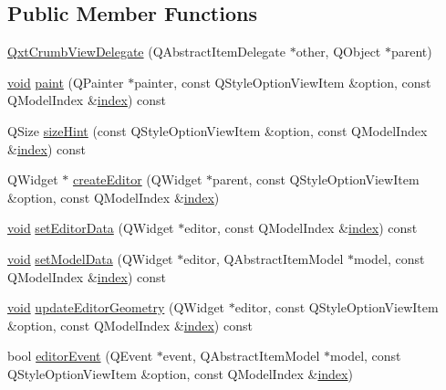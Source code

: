 \subsection*{Public Member Functions}
\begin{DoxyCompactItemize}
\item 
\hyperlink{class_qxt_crumb_view_delegate_ae9c2b83993bc41ea3527bfc10a24a4d6}{Qxt\-Crumb\-View\-Delegate} (Q\-Abstract\-Item\-Delegate $\ast$other, Q\-Object $\ast$parent)
\item 
\hyperlink{group___u_a_v_objects_plugin_ga444cf2ff3f0ecbe028adce838d373f5c}{void} \hyperlink{class_qxt_crumb_view_delegate_a82c74a11eef1a5a22da5bfe0237ffc08}{paint} (Q\-Painter $\ast$painter, const Q\-Style\-Option\-View\-Item \&option, const Q\-Model\-Index \&\hyperlink{glext_8h_ab47dd9958bcadea08866b42bf358e95e}{index}) const 
\item 
Q\-Size \hyperlink{class_qxt_crumb_view_delegate_a0dd337b5990640299b87a9cbba56016c}{size\-Hint} (const Q\-Style\-Option\-View\-Item \&option, const Q\-Model\-Index \&\hyperlink{glext_8h_ab47dd9958bcadea08866b42bf358e95e}{index}) const 
\item 
Q\-Widget $\ast$ \hyperlink{class_qxt_crumb_view_delegate_a87b1dc37aa876eaed3b289a5ee065052}{create\-Editor} (Q\-Widget $\ast$parent, const Q\-Style\-Option\-View\-Item \&option, const Q\-Model\-Index \&\hyperlink{glext_8h_ab47dd9958bcadea08866b42bf358e95e}{index})
\item 
\hyperlink{group___u_a_v_objects_plugin_ga444cf2ff3f0ecbe028adce838d373f5c}{void} \hyperlink{class_qxt_crumb_view_delegate_a2908e932cade12d60307efe8bef55402}{set\-Editor\-Data} (Q\-Widget $\ast$editor, const Q\-Model\-Index \&\hyperlink{glext_8h_ab47dd9958bcadea08866b42bf358e95e}{index}) const 
\item 
\hyperlink{group___u_a_v_objects_plugin_ga444cf2ff3f0ecbe028adce838d373f5c}{void} \hyperlink{class_qxt_crumb_view_delegate_ab4b4d929bc6add0ad936d179ffda930d}{set\-Model\-Data} (Q\-Widget $\ast$editor, Q\-Abstract\-Item\-Model $\ast$model, const Q\-Model\-Index \&\hyperlink{glext_8h_ab47dd9958bcadea08866b42bf358e95e}{index}) const 
\item 
\hyperlink{group___u_a_v_objects_plugin_ga444cf2ff3f0ecbe028adce838d373f5c}{void} \hyperlink{class_qxt_crumb_view_delegate_a2078285feff0102cf16dd2a6370ea1be}{update\-Editor\-Geometry} (Q\-Widget $\ast$editor, const Q\-Style\-Option\-View\-Item \&option, const Q\-Model\-Index \&\hyperlink{glext_8h_ab47dd9958bcadea08866b42bf358e95e}{index}) const 
\item 
bool \hyperlink{class_qxt_crumb_view_delegate_af820fb2b803887674250da0cad524d08}{editor\-Event} (Q\-Event $\ast$event, Q\-Abstract\-Item\-Model $\ast$model, const Q\-Style\-Option\-View\-Item \&option, const Q\-Model\-Index \&\hyperlink{glext_8h_ab47dd9958bcadea08866b42bf358e95e}{index})
\end{DoxyCompactItemize}
